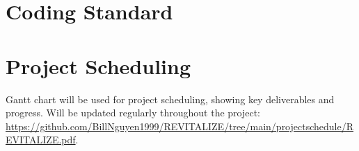 \documentclass{article}
\begin{document}
\section{Coding Standard}

\section{Project Scheduling}
Gantt chart will be used for project scheduling, showing key deliverables and progress. Will be updated regularly throughout the project:
\url{https://github.com/BillNguyen1999/REVITALIZE/tree/main/projectschedule/REVITALIZE.pdf}.
\end{document}
